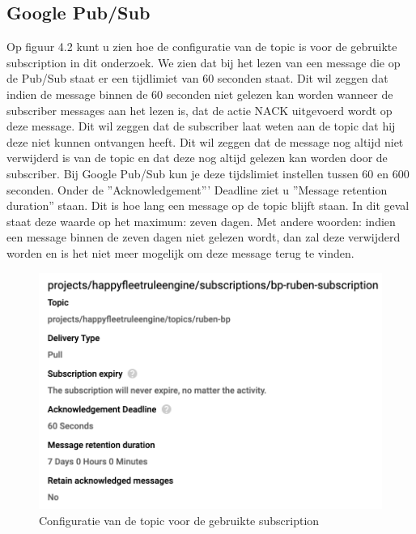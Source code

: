 \subsection{Google Pub/Sub}
Op figuur 4.2 kunt u zien hoe de configuratie van de topic is voor de gebruikte subscription in dit onderzoek. We zien dat bij het lezen van een message die op de Pub/Sub staat er een tijdlimiet van 60 seconden staat. Dit wil zeggen dat indien de message binnen de 60 seconden niet gelezen kan worden wanneer de subscriber messages aan het lezen is, dat de actie NACK uitgevoerd wordt op deze message. Dit wil zeggen dat de subscriber laat weten aan de topic dat hij deze niet kunnen ontvangen heeft. Dit wil zeggen dat de message nog altijd niet verwijderd is van de topic en dat deze nog altijd gelezen kan worden door de subscriber. Bij Google Pub/Sub kun je deze tijdslimiet instellen tussen 60 en 600 seconden. Onder de ''Acknowledgement''' Deadline ziet u ''Message retention duration'' staan. Dit is hoe lang een message op de topic blijft staan. In dit geval staat deze waarde op het maximum: zeven dagen. Met andere woorden: indien een message binnen de zeven dagen niet gelezen wordt, dan zal deze verwijderd worden en is het niet meer mogelijk om deze message terug te vinden.
\begin{figure}[h!]
    \centering
    \includegraphics[width=140mm]{../gpsConfig.png}
    \caption{Configuratie van de topic voor de gebruikte subscription}
    
\end{figure}
